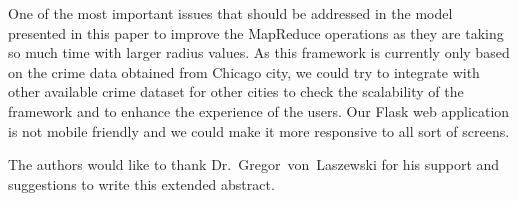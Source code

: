 One of the most important issues that should be addressed in the model
presented in this paper to improve the MapReduce operations as they
are taking so much time with larger radius values. As this framework
is currently only based on the crime data obtained from Chicago city,
we could try to integrate with other available crime dataset for other
cities to check the scalability of the framework and to enhance the
experience of the users. Our Flask web application is not mobile
friendly and we could make it more responsive to all sort of screens.

\begin{acks}
	
The authors would like to thank Dr.~Gregor~von~Laszewski for his
support and suggestions to write this extended abstract.
	
\end{acks}


 
